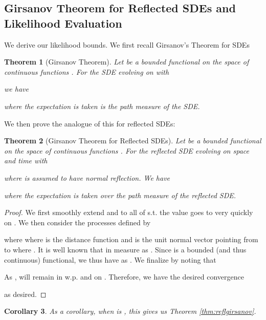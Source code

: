 \documentclass{article}
\theoremstyle{plain}
\newtheorem{theorem}{Theorem}[section]
\newtheorem{corollary}[theorem]{Corollary}
\theoremstyle{definition}
\theoremstyle{remark}
\begin{document}
\subsection{Girsanov Theorem for Reflected SDEs and Likelihood Evaluation}\label{sec:app:theory:girs}

We derive our likelihood bounds. We first recall Girsanov's Theorem for SDEs \citep{ksendal1987StochasticDE}

\begin{theorem}[Girsanov Theorem]\label{thm:app:girs}
    Let  be a bounded functional on the space of continuous functions . For the SDE evolving on  with

    

    we have

    

    where the expectation is taken is the path measure of the SDE.
\end{theorem}

We then prove the analogue of this for reflected SDEs:

\begin{theorem}[Girsanov Theorem for Reflected SDEs]\label{thm:app:girsrefl}
    Let  be a bounded functional on the space of continuous functions . For the reflected SDE evolving on  space and  time with

    

    where  is assumed to have normal reflection. We have

    

    where the expectation is taken over the path measure of the reflected SDE.
\end{theorem}

\begin{proof}
   We first smoothly extend  and  to all of  s.t. the value goes to  very quickly on . We then consider the processes  defined  by

    

    where  where  is the distance function and  is the unit normal vector pointing from  to  where . It is well known that  in measure as  \citep{Liu1993NumericalAT}. Since  is a bounded (and thus continuous) functional, we thus have  as . We finalize by noting that
    
    As ,  will remain in  w.p.  and  on . Therefore, we have the desired convergence
    
    as desired.
\end{proof}
\begin{corollary}
    As a corollary, when  is , this gives us Theorem \ref{thm:reflgirsanov}.
\end{corollary}
\end{document}
